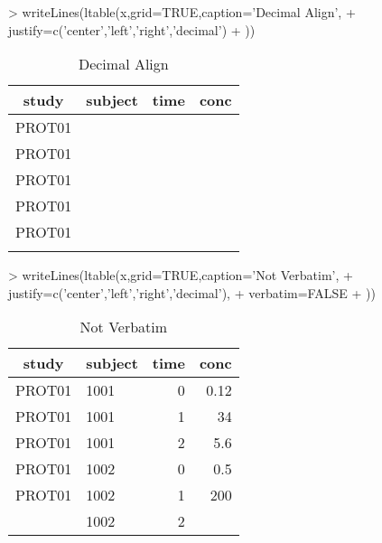 \documentclass[titlepage]{article}
\begin{document}
\begin{Schunk}
\begin{Sinput}
> writeLines(ltable(x,grid=TRUE,caption='Decimal Align',
+     justify=c('center','left','right','decimal')
+ ))
\end{Sinput}
\begin{table}[!htpb]
 \caption[Decimal Align]{Decimal Align }
 \begin{center}
  \begin{tabular}{c|l|r|r}
    \hline \hline
   study & subject & time & conc \\ \hline
   PROT01 & \verb#1001# & \verb#0# & \verb#0.12# \\ \hline
   PROT01 & \verb#1001# & \verb#1# & \verb#34   # \\ \hline
   PROT01 & \verb#1001# & \verb#2# & \verb#5.6 # \\ \hline
   PROT01 & \verb#1002# & \verb#0# & \verb#0.5 # \\ \hline
   PROT01 & \verb#1002# & \verb#1# & \verb#200   # \\ \hline
    & \verb#1002# & \verb#2# & \verb## \\ \hline
  \end{tabular}
 \end{center}
\end{table}\end{Schunk}
\begin{Schunk}
\begin{Sinput}
> writeLines(ltable(x,grid=TRUE,caption='Not Verbatim',
+     justify=c('center','left','right','decimal'),
+     verbatim=FALSE
+ ))
\end{Sinput}
\begin{table}[!htpb]
 \caption[Not Verbatim]{Not Verbatim }
 \begin{center}
  \begin{tabular}{c|l|r|r}
    \hline \hline
   study & subject & time & conc \\ \hline
   PROT01 & 1001 & 0 & 0.12 \\ \hline
   PROT01 & 1001 & 1 & 34    \\ \hline
   PROT01 & 1001 & 2 & 5.6  \\ \hline
   PROT01 & 1002 & 0 & 0.5  \\ \hline
   PROT01 & 1002 & 1 & 200    \\ \hline
    & 1002 & 2 &  \\ \hline
  \end{tabular}
 \end{center}
\end{table}\end{Schunk}
\end{document}
